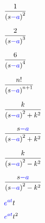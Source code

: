 \documentclass[multi={mymath},convert={density=1200}]{standalone}
\newenvironment{mymath}{$\displaystyle}{$}
\newcommand{\Lap}{\ensuremath{\mathscr{L}}}
\newcommand{\invLap}{\ensuremath{\mathscr{L}^{-1}}}
\begin{document}
\begin{mymath}
  \frac{1}{\left(s{\color{blue}-a}\right)^{2}}
\end{mymath}

\begin{mymath}
  \frac{2}{\left(s{\color{blue}-a}\right)^{3}}
\end{mymath}

\begin{mymath}
  \frac{6}{\left(s{\color{blue}-a}\right)^{4}}
\end{mymath}

\begin{mymath}
  \frac{n!}{\left(s{\color{blue}-a}\right)^{n+1}}
\end{mymath}

\begin{mymath}
  \frac{k}{\left( s {\color{blue}-a} \right)^{2} + k^{2}}
\end{mymath}

\begin{mymath}
  \frac{s{\color{blue}-a}}{\left( s {\color{blue}-a} \right)^{2} + k^{2}}
\end{mymath}

\begin{mymath}
  \frac{k}{\left( s {\color{blue}-a} \right)^{2} - k^{2}}
\end{mymath}

\begin{mymath}
  \frac{s{\color{blue}-a}}{\left( s {\color{blue}-a} \right)^{2} - k^{2}}
\end{mymath}

\begin{mymath}
  {\color{blue}e^{at}}t
\end{mymath}

\begin{mymath}
  {\color{blue}e^{at}}t^{2}
\end{mymath}
\end{document}
